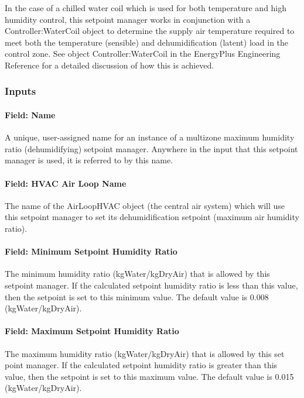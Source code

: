 In the case of a chilled water coil which is used for both temperature and high humidity control, this setpoint manager works in conjunction with a Controller:WaterCoil object to determine the supply air temperature required to meet both the temperature (sensible) and dehumidification (latent) load in the control zone. See object Controller:WaterCoil in the EnergyPlus Engineering Reference for a detailed discussion of how this is achieved.

\subsubsection{Inputs}\label{inputs-19-005}

\paragraph{Field: Name}\label{field-name-19-003}

A unique, user-assigned name for an instance of a multizone maximum humidity ratio (dehumidifying) setpoint manager. Anywhere in the input that this setpoint manager is used, it is referred to by this name.

\paragraph{Field: HVAC Air Loop Name}\label{field-hvac-air-loop-name-9}

The name of the AirLoopHVAC object (the central air system) which will use this setpoint manager to set its dehumidification setpoint (maximum air humidity ratio).

\paragraph{Field: Minimum Setpoint Humidity Ratio}\label{field-minimum-setpoint-humidity-ratio-4}

The minimum humidity ratio (kgWater/kgDryAir) that is allowed by this setpoint manager. If the calculated setpoint humidity ratio is less than this value, then the setpoint is set to this minimum value. The default value is 0.008 (kgWater/kgDryAir).

\paragraph{Field: Maximum Setpoint Humidity Ratio}\label{field-maximum-setpoint-humidity-ratio-4}

The maximum humidity ratio (kgWater/kgDryAir) that is allowed by this set point manager. If the calculated setpoint humidity ratio is greater than this value, then the setpoint is set to this maximum value. The default value is 0.015 (kgWater/kgDryAir).

